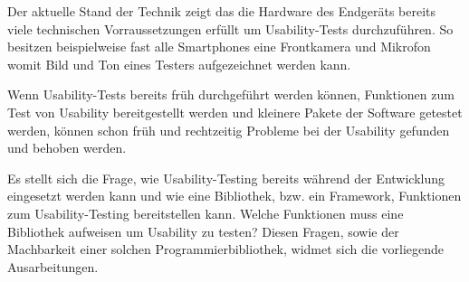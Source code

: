 Der aktuelle Stand der Technik zeigt das die Hardware des Endgeräts bereits viele technischen Vorraussetzungen erfüllt um Usability-Tests durchzuführen. So besitzen beispielweise fast alle Smartphones eine Frontkamera und Mikrofon womit Bild und Ton eines Testers aufgezeichnet werden kann. 

Wenn Usability-Tests bereits früh durchgeführt werden können, Funktionen zum Test von Usability bereitgestellt werden und kleinere Pakete der Software getestet werden, können schon früh und rechtzeitig Probleme bei der Usability gefunden und behoben werden.

Es stellt sich die Frage, wie Usability-Testing bereits während der Entwicklung eingesetzt werden kann und wie eine Bibliothek, bzw. ein Framework, Funktionen zum Usability-Testing bereitstellen kann. Welche Funktionen muss eine Bibliothek aufweisen um Usability zu testen? Diesen Fragen, sowie der Machbarkeit einer solchen Programmierbibliothek, widmet sich die vorliegende Ausarbeitungen. 







\cite{usabilityEngineeringKompakt}

\cite{nodejs_therightway}